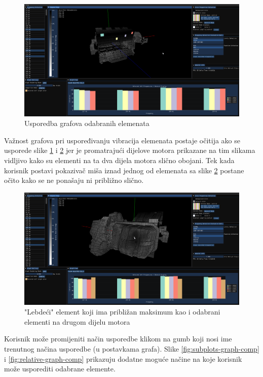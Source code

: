 \documentclass[times, utf8, diplomski]{fer}
\begin{document}
\begin{figure} [H]
	\centering
    \includegraphics[width=\textwidth]{demonstration/selected_cells_max.png}
    \caption{Usporedba grafova odabranih elemenata}
    \label{fig:selected-cells-graphs}
\end{figure}

Važnost grafova pri uspoređivanju vibracija elemenata postaje očitija ako se usporede slike \ref{fig:selected-cells-graphs} i \ref{fig:hovered-cell-selected-cells} jer je promatrajući dijelove motora prikazane na tim slikama vidljivo kako su elementi na ta dva dijela motora slično obojani. Tek kada korisnik postavi pokazivač miša iznad jednog od elemenata sa slike \ref{fig:hovered-cell-selected-cells} postane očito kako se ne ponašaju ni približno slično.

\begin{figure} [H]
	\centering
    \includegraphics[width=\textwidth]{demonstration/hovered_cell_max.png}
    \caption{"Lebdeći" element koji ima približan maksimum kao i odabrani elementi na drugom dijelu motora}
    \label{fig:hovered-cell-selected-cells}
\end{figure}

Korisnik može promijeniti način usporedbe klikom na gumb koji nosi ime trenutnog načina usporedbe (u postavkama grafa). Slike \ref{fig:subplots-graph-comp} i \ref{fig:relative-graph-comp} prikazuju dodatne moguće načine na koje korisnik može usporediti odabrane elemente.
\end{document}
